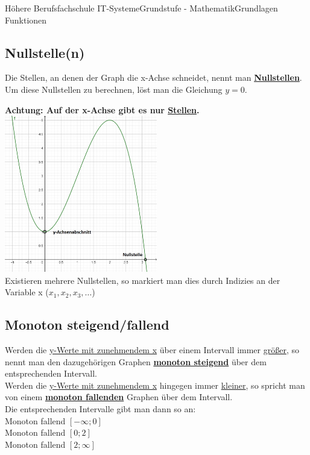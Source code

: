\documentclass[11pt,twocolumn,oneside,openany,headings=optiontotoc,11pt,numbers=noenddot]{article}
\begin{document}
\begin{worksheet}{Höhere Berufsfachschule IT-Systeme}{Grundstufe - Mathematik}{Grundlagen Funktionen}
		\subsection*{Nullstelle(n)}
		Die Stellen, an denen der Graph die x-Achse schneidet, nennt man \textbf{\underline{Nullstellen}}. Um diese Nullstellen zu berechnen, löst man die Gleichung \(y = 0\).\\
		\par\bigskip\noindent
		\textbf{Achtung: Auf der x-Achse gibt es nur \underline{Stellen}.}\\
		\includegraphics[width=0.5\textwidth]{../99_Bilder/nyAA.png}\\
		Existieren mehrere Nullstellen, so markiert man dies durch Indizies an der Variable x (\(x_1, x_2, x_3, \ldots\))
		\subsection*{Monoton steigend/fallend}
		Werden die \underline{y-Werte mit zunehmendem x} über einem Intervall immer \underline{größer}, so nennt man den dazugehörigen Graphen \textbf{\underline{monoton steigend}} über dem entsprechenden Intervall.\\
		Werden die \underline{y-Werte mit zunehmendem x} hingegen immer \underline{kleiner}, so spricht man von einem \textbf{\underline{monoton fallenden}} Graphen über dem Intervall.\\
		Die entsprechenden Intervalle gibt man dann so an:\\
		Monoton fallend \(\left[-\infty;0\right]\)\\
		Monoton fallend \(\left[0;2\right]\)\\
		Monoton fallend \(\left[2;\infty\right]\)

\end{worksheet}
\end{document}
